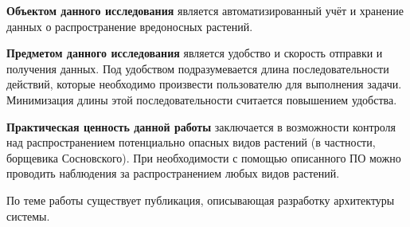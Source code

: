\tab
\textbf{Объектом данного исследования} является автоматизированный учёт и хранение данных о распространение вредоносных растений.

\tab
\textbf{Предметом данного исследования} является удобство и скорость отправки и получения данных.
Под удобством подразумевается длина последовательности действий, которые необходимо произвести пользователю для выполнения задачи.
Минимизация длины этой последовательности считается повышением удобства.

\tab
\textbf{Практическая ценность данной работы} заключается в возможности контроля над распространением потенциально опасных видов растений (в частности, борщевика Сосновского).
При необходимости с помощью описанного ПО можно проводить наблюдения за распространением любых видов растений.

\tab
По теме работы существует публикация\cite{article}, описывающая разработку архитектуры системы.
